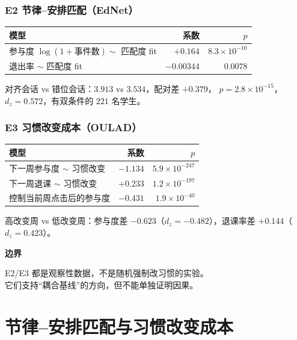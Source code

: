 \documentclass[UTF8,a4paper,11pt]{ctexart}
\newenvironment{explainbox}[1]
{\begin{center}\begin{minipage}{0.94\textwidth}\colorbox{boxbg}{\parbox{0.92\textwidth}{\textbf{#1}\par\vspace{2pt}}}}
{\end{minipage}\end{center}}
\begin{document}
\subsubsection{E2 节律--安排匹配（EdNet）}

\begin{center}
\begin{longtable}{@{}p{4.6cm}rr@{}}
\toprule
\textbf{模型} & \textbf{系数} & \textbf{$p$} \\
\midrule
参与度 $\log(1+\text{事件数})\sim$ 匹配度 fit & $+0.164$ & $8.3\times10^{-10}$ \\
退出率 $\sim$ 匹配度 fit & $-0.00344$ & $0.0078$ \\
\bottomrule
\end{longtable}
\end{center}

对齐会话 vs 错位会话：$3.913$ vs $3.534$，配对差 $+0.379$，
$p=2.8\times10^{-15}$，$d_z=0.572$，有双条件的 $221$ 名学生。

\subsubsection{E3 习惯改变成本（OULAD）}

\begin{center}
\begin{longtable}{@{}p{6.0cm}rr@{}}
\toprule
\textbf{模型} & \textbf{系数} & \textbf{$p$} \\
\midrule
下一周参与度 $\sim$ 习惯改变 & $-1.134$ & $5.9\times10^{-247}$ \\
下一周退课 $\sim$ 习惯改变 & $+0.233$ & $1.2\times10^{-197}$ \\
控制当前周点击后的参与度 & $-0.431$ & $1.9\times10^{-40}$ \\
\bottomrule
\end{longtable}
\end{center}

高改变周 vs 低改变周：参与度差 $-0.623$（$d_z=-0.482$），退课率差 $+0.144$（$d_z=0.423$）。

\begin{explainbox}{边界}
E2/E3 都是观察性数据，不是随机强制改习惯的实验。\\
它们支持“耦合基线”的方向，但不能单独证明因果。
\end{explainbox}

\newpage


\section{节律--安排匹配与习惯改变成本}
\end{document}
